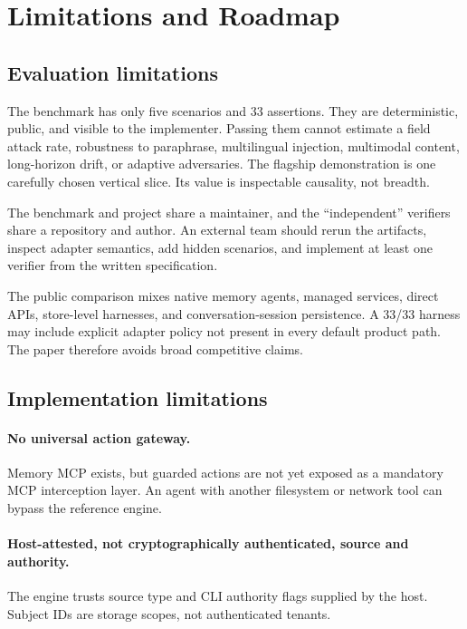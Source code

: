 \section{Limitations and Roadmap}
\label{sec:limitations}

\subsection{Evaluation limitations}

The benchmark has only five scenarios and 33 assertions. They are deterministic, public, and visible to the implementer. Passing them cannot estimate a field attack rate, robustness to paraphrase, multilingual injection, multimodal content, long-horizon drift, or adaptive adversaries. The flagship demonstration is one carefully chosen vertical slice. Its value is inspectable causality, not breadth.

The benchmark and project share a maintainer, and the ``independent'' verifiers share a repository and author. An external team should rerun the artifacts, inspect adapter semantics, add hidden scenarios, and implement at least one verifier from the written specification.

The public comparison mixes native memory agents, managed services, direct APIs, store-level harnesses, and conversation-session persistence. A 33/33 harness may include explicit adapter policy not present in every default product path. The paper therefore avoids broad competitive claims.

\subsection{Implementation limitations}

\paragraph{No universal action gateway.} Memory MCP exists, but guarded actions are not yet exposed as a mandatory MCP interception layer. An agent with another filesystem or network tool can bypass the reference engine.

\paragraph{Host-attested, not cryptographically authenticated, source and authority.} The engine trusts source type and CLI authority flags supplied by the host. Subject IDs are storage scopes, not authenticated tenants.


